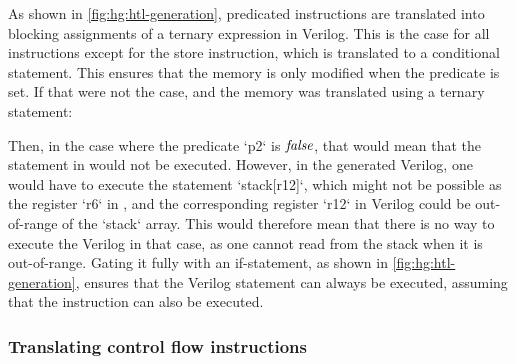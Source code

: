 As shown in \cref{fig:hg:htl-generation}, predicated instructions are translated
into blocking assignments of a ternary expression in Verilog.  This is the case
for all instructions except for the store instruction, which is translated to a
conditional statement.  This ensures that the memory is only modified when the
predicate is set.  If that were not the case, and the memory was translated
using a ternary statement:

\begin{center}
\end{center}

\noindent Then, in the case where the predicate \rtlinline`p2` is $\mathit{false}$,
that would mean that the statement in \rtlsubpar{} would not be executed.
However, in the generated Verilog, one would have to execute the statement
\veriloginline`stack[r12]`, which might not be possible as the register
\rtlinline`r6` in \rtlsubpar{}, and the corresponding register
\veriloginline`r12` in Verilog could be out-of-range of the
\veriloginline`stack` array.  This would therefore mean that there is no way to
execute the Verilog in that case, as one cannot read from the stack when it is
out-of-range.  Gating it fully with an if-statement, as shown in
\cref{fig:hg:htl-generation}, ensures that the Verilog statement can always be
executed, assuming that the \rtlsubpar{} instruction can also be executed.

\subsubsection{Translating control flow instructions}%
\label{sec:hg:translating-control-flow-instructions}


